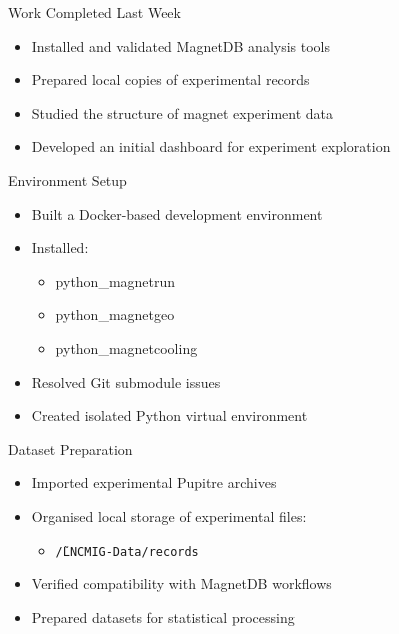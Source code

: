 \documentclass[professionalfonts,aspectratio=169]{beamer}
\begin{document}

\begin{frame}{Work Completed Last Week}
    \begin{itemize}
        \item Installed and validated MagnetDB analysis tools
        \item Prepared local copies of experimental records
        \item Studied the structure of magnet experiment data
        \item Developed an initial dashboard for experiment exploration
    \end{itemize}
\end{frame}


\begin{frame}{Environment Setup}
    \begin{itemize}
        \item Built a Docker-based development environment
        \item Installed:
        \begin{itemize}
            \item python\_magnetrun
            \item python\_magnetgeo
            \item python\_magnetcooling
        \end{itemize}
        \item Resolved Git submodule issues
        \item Created isolated Python virtual environment
    \end{itemize}
\end{frame}


\begin{frame}{Dataset Preparation}
    \begin{itemize}
        \item Imported experimental Pupitre archives
        \item Organised local storage of experimental files:
        \begin{itemize}
            \item \texttt{\~/LNCMIG-Data/records}
        \end{itemize}
        \item Verified compatibility with MagnetDB workflows
        \item Prepared datasets for statistical processing
    \end{itemize}
\end{frame}
\end{document}
